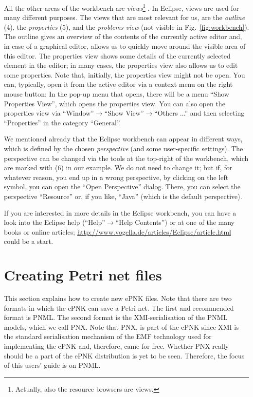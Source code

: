 All the other areas of the workbench are%
\emph{views}\footnote
{Actually, also the resource browsers are views.}%
. In Eclipse, views are used for many different purposes. The
views that are most relevant for us, are the \emph{outline}%
(4), the \emph{properties}%
(5), and the \emph{problems view}%
(not visible in
Fig.~\ref{fig:workbench}). The outline gives an overview of the contents of
the currently active editor and, in case of a graphical editor, allows us to
quickly move around the visible area of this editor. The properties view
shows some details of the currently selected element in the editor; in many
cases, the properties view also allows us to edit some properties. Note that,
initially, the properties view might not be open. You can, typically, open it
from the active editor via a context menu on the right mouse button:
In the pop-up menu that opens, there will be a menu ``Show Properties
View'', which opens the properties view. You can also open
the properties view via 
``Window''$\rightarrow$``Show View''$\rightarrow$``Others ...'' and
then selecting ``Properties'' in the category ``General''.

We mentioned already that the Eclipse workbench can appear
in different ways, which is defined by the chosen \emph{perspective}%
(and some user-specific settings). The perspective can be changed via
the tools at the top-right of the workbench, which are marked with (6)
in our example. We do not need to change it; but if, for whatever reason, you
end up in a wrong perspective, by clicking on the left symbol,
you can open the ``Open Perspective'' dialog. There, you can
select the perspective ``Resource'' or, if you like, ``Java'' (which is
the default perspective).
 
If you are interested in more details in the Eclipse workbench,
you can have a look into the Eclipse help
(``Help''$\rightarrow$``Help Contents'') or at one of the
many books or online articles;
\url{http://www.vogella.de/articles/Eclipse/article.html} could
be a start.%

\section{Creating Petri net files}
\label{sec:CreatingPetriNetDocuments}

This section explains how to create new ePNK files. Note that there
are two formats in which the ePNK can save a Petri net. The first and
recommended format is PNML. The second format is the XMI-serialisation of the
PNML models, which we call PNX.  Note that PNX, is part of the ePNK since XMI is the
standard serialisation mechanism of the EMF technology used for implementing
the ePNK and, therefore, came for free. Whether PNX really should be a part of
the ePNK distribution is yet to be seen. Therefore, the focus of
this users' guide is on PNML.

